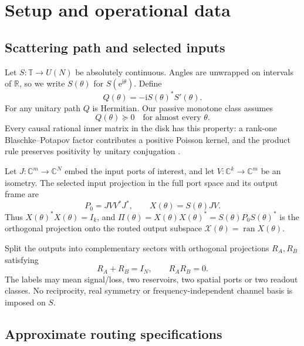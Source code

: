 \documentclass[11pt]{article}
\theoremstyle{definition}
\theoremstyle{remark}
\newcommand{\C}{\mathbb{C}}
\newcommand{\T}{\mathbb{T}}
\newcommand{\ran}{\operatorname{ran}}
\newcommand{\e}{\mathrm{e}}
\begin{document}
\section{Setup and operational data}

\subsection{Scattering path and selected inputs}

Let $S:\T\to U(N)$ be absolutely continuous.  Angles are unwrapped on
intervals of $\mathbb R$, so we write $S(\theta)$ for
$S(\e^{\mathrm{i}\theta})$.  Define
\begin{equation}\label{eq:Qdef}
 Q(\theta)=-\mathrm{i}S(\theta)^*S'(\theta).
\end{equation}
For any unitary path $Q$ is Hermitian.  Our passive monotone class assumes
\begin{equation}\label{eq:positiveQ}
 Q(\theta)\succeq0\quad\text{for almost every }\theta.
\end{equation}
Every causal rational inner matrix in the disk has this property: a
rank-one Blaschke--Potapov factor contributes a positive Poisson kernel, and
the product rule preserves positivity by unitary conjugation
\cite{Potapov1955,AlpayJorgensenLewkowicz2016}.

Let $J:\C^m\to\C^N$ embed the input ports of interest, and let
$V:\C^k\to\C^m$ be an isometry.  The selected input projection in the full
port space and its output frame are
\begin{equation}\label{eq:frames}
 P_0=JVV^*J^*,
 \qquad
 X(\theta)=S(\theta)JV.
\end{equation}
Thus $X(\theta)^*X(\theta)=I_k$, and
$\Pi(\theta)=X(\theta)X(\theta)^*=S(\theta)P_0S(\theta)^*$ is the
orthogonal projection onto the routed output subspace
$\mathcal X(\theta)=\ran X(\theta)$.

Split the outputs into complementary sectors with orthogonal projections
$R_A,R_B$ satisfying
\begin{equation}\label{eq:sectors}
 R_A+R_B=I_N,
 \qquad R_AR_B=0.
\end{equation}
The labels may mean signal/loss, two reservoirs, two spatial ports or two
readout classes.  No reciprocity, real symmetry or frequency-independent
channel basis is imposed on $S$.

\subsection{Approximate routing specifications}
\end{document}
